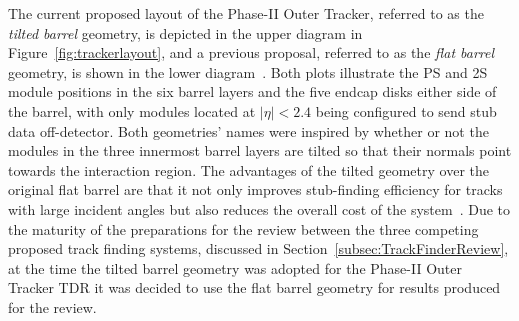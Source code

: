 The current proposed layout of the Phase-II Outer Tracker, referred to as the \emph{tilted barrel} geometry, is depicted in the upper diagram in Figure~\ref{fig:trackerlayout}, and a previous proposal, referred to as the \emph{flat barrel} geometry, is shown in the lower diagram~\cite{CMS_Upgrade_TP}.
Both plots illustrate the PS and 2S module positions in the six barrel layers and the five endcap disks either side of the barrel, with only modules located at $|\eta| < 2.4$ being configured to send stub data off-detector.
Both geometries' names were inspired by whether or not the modules in the three innermost barrel layers are tilted so that their normals point towards the interaction region.
The advantages of the tilted geometry over the original flat barrel are that it not only improves stub-finding efficiency for tracks with large incident angles but also reduces the overall cost of the system~\cite{P2TrackerTDR}.
Due to the maturity of the preparations for the review between the three competing proposed track finding systems, discussed in Section~\ref{subsec:TrackFinderReview}, at the time the tilted barrel geometry was adopted for the Phase-II Outer Tracker TDR it was decided to use the flat barrel geometry for results produced for the review.

